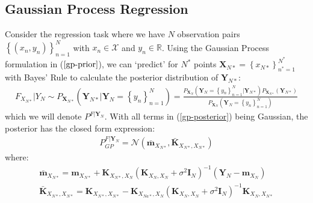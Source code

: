 \documentclass[twoside,11pt]{article}
\begin{document}
\subsection{Gaussian Process Regression \cite{wild2023connections}}
Consider the regression task where we have $N$ observation pairs $\left\{(x_n, y_n)\right\}_{n=1}^N$ with $x_n \in \mathcal{X}$ and $y_n \in \mathbb{R}$. Using the Gaussian Process formulation in ($\ref{gp-prior}$), we can `predict' for $N^*$ points $\mathbf{X}_{N*} = \left\{ x_{N*}\right\}_{n^*=1}^{N^*}$ with Bayes' Rule to calculate the posterior distribution of $\mathbf{Y}_{N*}$:
\begin{align}
    F_{X_{N*}} \vert Y_N \sim P_{\mathbf{X}_{N*}}(\mathbf{Y}_{N*} | \mathbf{Y}_N= \left\{ y_n\right\}_{n=1}^N) = \frac{ P_{\mathbf{X}_N}(\mathbf{Y}_N=\left\{ y_n\right\}_{n=1}^N \vert \mathbf{Y}_{N*})  P_{\mathbf{X}_{N*}}(\mathbf{Y}_{N*})}{ P_{\mathbf{X}_N}(\mathbf{Y}_N= \left\{ y_n\right\}_{n=1}^N)}
    \label{gp-posterior}
\end{align}
which we will denote $P^{F \vert \mathbf{Y}_N}$. With all terms in (\ref{gp-posterior}) being Gaussian, the posterior has the closed form expression:
\begin{align}
    P^{F \vert \mathbf{Y}_N}_{GP} =  \mathcal{N}(\bar{\mathbf{m}}_{X_{N*}}, \bar{\mathbf{K}}_{X_{N*}, X_{N*}})
\end{align}
where:
\begin{align}
    \label{gp-posterior-mean}
    \bar{\mathbf{m}}_{X_{N*}} = \mathbf{m}_{X_{N*}} + \mathbf{K}_{X_{N*}, X_N} \left( \mathbf{K}_{X_N, X_N} + \sigma^2 \mathbf{I}_N\right)^{-1} \left( \mathbf{Y}_N - \mathbf{m}_{X_N}\right)\\
    \label{gp-posterior-covariance}
    \bar{\mathbf{K}}_{X_{N*}, X_{N*}} = \mathbf{K}_{X_{N*}, X_{N*}} - \mathbf{K}_{X_{Na*}, X_N}\left( \mathbf{K}_{X_N, X_N} + \sigma^2 \mathbf{I}_N\right)^{-1}\mathbf{K}_{X_N, X_{N*}}
\end{align}
\end{document}
